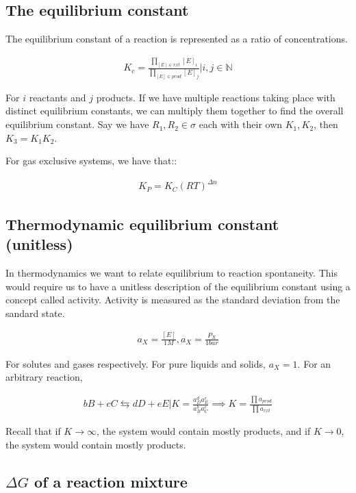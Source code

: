 \documentclass[12pt]{book}
\begin{document}
\subsection*{The equilibrium constant}

The equilibrium constant of a reaction is represented as a ratio of concentrations.

\begin{align*}
    K_c=\frac{\prod_{\left[E\right]\in rxt} \left[E\right]_i}{\prod_{\left[E\right]\in prod} \left[E\right]_j}|i,j\in \mathbb{N}
\end{align*}

For $i$ reactants and $j$ products. If we have multiple reactions taking place with distinct equilibrium constants, we can multiply them together to find the overall equilibrium constant. Say we have $R_1,R_2\in \sigma$ each with their own $K_1,K_2$, then $K_3=K_1K_2$.

For gas exclusive systems, we have that::

\begin{align*}
    K_P=K_C (RT)^{\Delta n}
\end{align*}

\subsection*{Thermodynamic equilibrium constant (unitless)}

In thermodynamics we want to relate equilibrium to reaction spontaneity. This would require us to have a unitless description of the equilibrium constant using a concept called activity. Activity is measured as the standard deviation from the sandard state.

\begin{align*}
    a_X=\frac{\left[E\right]}{1M}, a_X=\frac{P_X}{1bar}
\end{align*}

For solutes and gases respectively. For pure liquids and solids, $a_X=1$. For an arbitrary reaction,

\begin{align*}
    bB+cC\leftrightarrows dD+eE|K=\frac{a_D^d a_E^e}{a_B^b a_C^c}\implies K=\frac{\prod a_{prod}}{\prod a_{rxt}}
\end{align*}

Recall that if $K\rightarrow \infty$, the system would contain mostly products, and if $K\rightarrow 0$, the system would contain mostly products.

\subsection*{$\Delta G$ of a reaction mixture}
\end{document}
